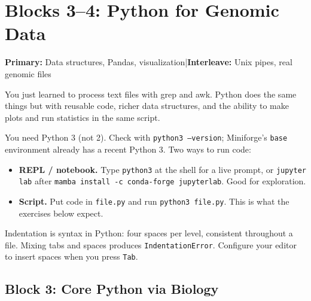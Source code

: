\chapter{Blocks 3--4: Python for Genomic Data}\label{chap:python}

\textbf{Primary:} Data structures, Pandas, visualization\quad|\quad\textbf{Interleave:} Unix pipes, real genomic files

\begin{brainbox}
You just learned to process text files with grep and awk. Python does the same things but with reusable code, richer data structures, and the ability to make plots and run statistics in the same script.
\end{brainbox}

\begin{tipbox}
You need Python 3 (not 2). Check with \texttt{python3 --version}; Miniforge's \texttt{base} environment already has a recent Python 3. Two ways to run code:
\begin{itemize}[nosep]
  \item \textbf{REPL / notebook.} Type \texttt{python3} at the shell for a live prompt, or \texttt{jupyter lab} after \texttt{mamba install -c conda-forge jupyterlab}. Good for exploration.
  \item \textbf{Script.} Put code in \texttt{file.py} and run \texttt{python3 file.py}. This is what the exercises below expect.
\end{itemize}
Indentation is syntax in Python: four spaces per level, consistent throughout a file. Mixing tabs and spaces produces \texttt{IndentationError}. Configure your editor to insert spaces when you press \texttt{Tab}.
\end{tipbox}


\section{Block 3: Core Python via Biology}

